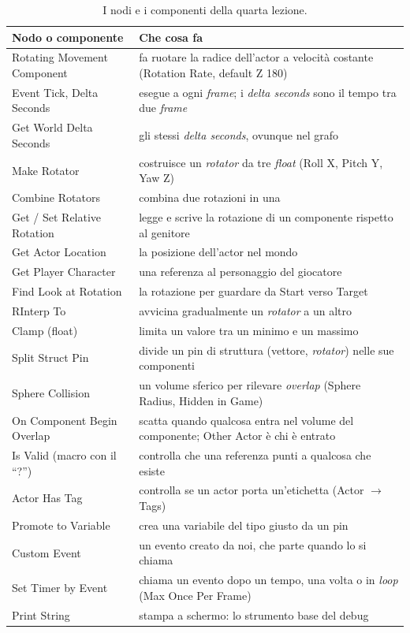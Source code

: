 \begin{table}[htbp]
\centering
\small
\begin{tabular}{@{}p{4.0cm}p{10.0cm}@{}}
\toprule
\textbf{Nodo o componente} & \textbf{Che cosa fa} \\
\midrule
Rotating Movement Component & fa ruotare la radice dell'actor a velocità costante
(Rotation Rate, default Z 180) \\
Event Tick, Delta Seconds & esegue a ogni \emph{frame}; i \emph{delta seconds} sono il
tempo tra due \emph{frame} \\
Get World Delta Seconds & gli stessi \emph{delta seconds}, ovunque nel grafo \\
Make Rotator & costruisce un \emph{rotator} da tre \emph{float} (Roll X, Pitch Y,
Yaw Z) \\
Combine Rotators & combina due rotazioni in una \\
Get / Set Relative Rotation & legge e scrive la rotazione di un componente rispetto al
genitore \\
Get Actor Location & la posizione dell'actor nel mondo \\
Get Player Character & una referenza al personaggio del giocatore \\
Find Look at Rotation & la rotazione per guardare da Start verso Target \\
RInterp To & avvicina gradualmente un \emph{rotator} a un altro \\
Clamp (float) & limita un valore tra un minimo e un massimo \\
Split Struct Pin & divide un pin di struttura (vettore, \emph{rotator}) nelle sue
componenti \\
Sphere Collision & un volume sferico per rilevare \emph{overlap} (Sphere Radius,
Hidden in Game) \\
On Component Begin Overlap & scatta quando qualcosa entra nel volume del componente;
Other Actor è chi è entrato \\
Is Valid (macro con il ``?'') & controlla che una referenza punti a qualcosa che
esiste \\
Actor Has Tag & controlla se un actor porta un'etichetta (Actor $\rightarrow$ Tags) \\
Promote to Variable & crea una variabile del tipo giusto da un pin \\
Custom Event & un evento creato da noi, che parte quando lo si chiama \\
Set Timer by Event & chiama un evento dopo un tempo, una volta o in \emph{loop} (Max
Once Per Frame) \\
Print String & stampa a schermo: lo strumento base del debug \\
\bottomrule
\end{tabular}
\caption{I nodi e i componenti della quarta lezione.}
\label{ue4:tab:nodi}
\end{table}

